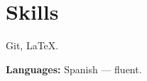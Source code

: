 \section{Skills}

\par Git, \LaTeX.

{

\setlength{\parskip}{\vspaceDefault}

{}
\label{sec:languages}

\par \textbf{Languages:} Spanish --- fluent.

}
